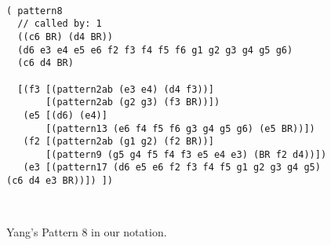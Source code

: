 \begin{figure}[ht]
{\footnotesize
\ \hfill 
\begin{verbatim}
( pattern8
  // called by: 1
  ((c6 BR) (d4 BR))
  (d6 e3 e4 e5 e6 f2 f3 f4 f5 f6 g1 g2 g3 g4 g5 g6)
  (c6 d4 BR)

  [(f3 [(pattern2ab (e3 e4) (d4 f3))]
       [(pattern2ab (g2 g3) (f3 BR))])
   (e5 [(d6) (e4)]
       [(pattern13 (e6 f4 f5 f6 g3 g4 g5 g6) (e5 BR))])
   (f2 [(pattern2ab (g1 g2) (f2 BR))]
       [(pattern9 (g5 g4 f5 f4 f3 e5 e4 e3) (BR f2 d4))])
   (e3 [(pattern17 (d6 e5 e6 f2 f3 f4 f5 g1 g2 g3 g4 g5) (c6 d4 e3 BR))]) ])
\end{verbatim}
\hfill \  
}
\caption{Yang's Pattern 8 in our notation.}
\label{fig:p8}
\end{figure}
